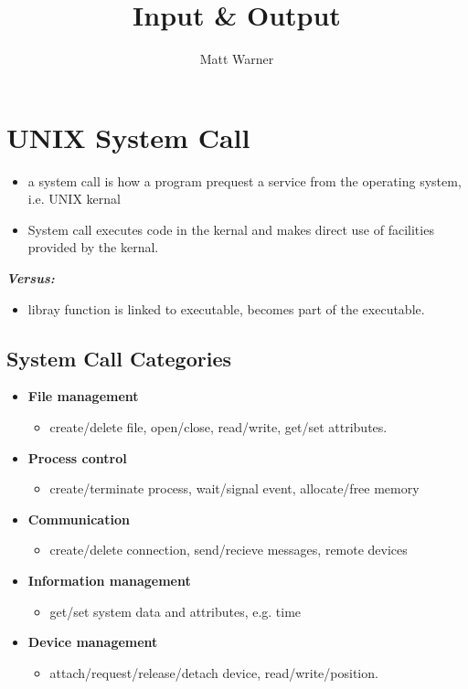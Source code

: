 \documentclass{report}
\title{\Huge{Input \& Output}}
\author{\huge{Matt Warner}}
\date{\huge{}}
\begin{document}
  \maketitle
  \tableofcontents
  \newpage
  \section{UNIX System Call} 
  \begin{itemize}
    \item a system call is how a program prequest a service from the operating system, i.e. UNIX kernal
    \item System call executes code in the kernal and makes direct use of facilities provided by the kernal.
  \end{itemize}
  \bigbreak \noindent
  \textit{\textbf{Versus:}}
  \begin{itemize}
    \item libray function is linked to executable, becomes part of the executable.
  \end{itemize}
  \subsection{System Call Categories}
  \begin{itemize}
    \item \textbf{File management}
      \begin{itemize}[label=$\circ$]
        \item create/delete file, open/close, read/write, get/set attributes.
      \end{itemize}
    \item \textbf{Process control}
      \begin{itemize}[label=$\circ$]
        \item create/terminate process, wait/signal event, allocate/free memory
      \end{itemize}
    \item \textbf{Communication}
      \begin{itemize}[label=$\circ$]
        \item create/delete connection, send/recieve messages, remote devices
      \end{itemize}
    \item \textbf{Information management}
      \begin{itemize}[label=$\circ$]
        \item get/set system data and attributes, e.g. time
      \end{itemize}
    \item \textbf{Device management}
      \begin{itemize}[label=$\circ$]
        \item attach/request/release/detach device, read/write/position.
      \end{itemize}
  \end{itemize}
\end{document}
